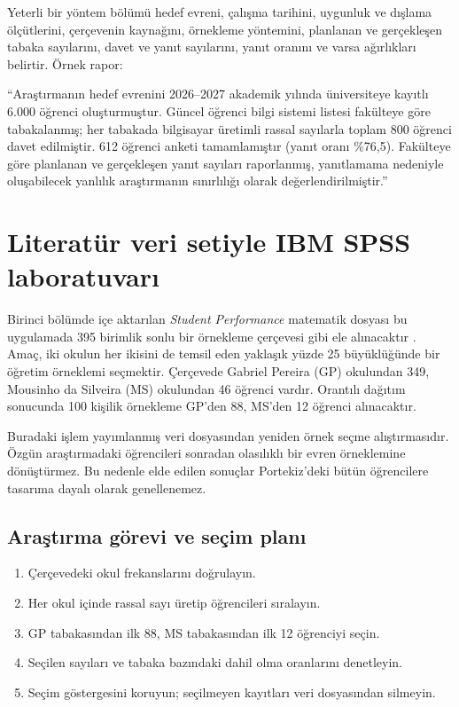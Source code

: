 Yeterli bir yöntem bölümü hedef evreni, çalışma tarihini, uygunluk ve dışlama
ölçütlerini, çerçevenin kaynağını, örnekleme yöntemini, planlanan ve gerçekleşen
tabaka sayılarını, davet ve yanıt sayılarını, yanıt oranını ve varsa ağırlıkları
belirtir. Örnek rapor:

``Araştırmanın hedef evrenini 2026--2027 akademik yılında üniversiteye kayıtlı
6.000 öğrenci oluşturmuştur. Güncel öğrenci bilgi sistemi listesi fakülteye
göre tabakalanmış; her tabakada bilgisayar üretimli rassal sayılarla toplam
800 öğrenci davet edilmiştir. 612 öğrenci anketi tamamlamıştır (yanıt oranı
\%76{,}5). Fakülteye göre planlanan ve gerçekleşen yanıt sayıları raporlanmış,
yanıtlamama nedeniyle oluşabilecek yanlılık araştırmanın sınırlılığı olarak
değerlendirilmiştir.''

\section{Literatür veri setiyle IBM SPSS laboratuvarı}

Birinci bölümde içe aktarılan \emph{Student Performance} matematik dosyası bu
uygulamada 395 birimlik sonlu bir örnekleme çerçevesi gibi ele alınacaktır
\cite{cortez2008data,cortezsilva2008}. Amaç, iki okulun her ikisini de temsil
eden yaklaşık yüzde 25 büyüklüğünde bir öğretim örneklemi seçmektir. Çerçevede
Gabriel Pereira (GP) okulundan 349, Mousinho da Silveira (MS) okulundan 46
öğrenci vardır. Orantılı dağıtım sonucunda 100 kişilik örnekleme GP'den 88,
MS'den 12 öğrenci alınacaktır.

\begin{researchbox}
Buradaki işlem yayımlanmış veri dosyasından yeniden örnek seçme alıştırmasıdır.
Özgün araştırmadaki öğrencileri sonradan olasılıklı bir evren örneklemine
dönüştürmez. Bu nedenle elde edilen sonuçlar Portekiz'deki bütün öğrencilere
tasarıma dayalı olarak genellenemez.
\end{researchbox}

\subsection{Araştırma görevi ve seçim planı}

\begin{enumerate}
  \item Çerçevedeki okul frekanslarını doğrulayın.
  \item Her okul içinde rassal sayı üretip öğrencileri sıralayın.
  \item GP tabakasından ilk 88, MS tabakasından ilk 12 öğrenciyi seçin.
  \item Seçilen sayıları ve tabaka bazındaki dahil olma oranlarını denetleyin.
  \item Seçim göstergesini koruyun; seçilmeyen kayıtları veri dosyasından silmeyin.
\end{enumerate}


